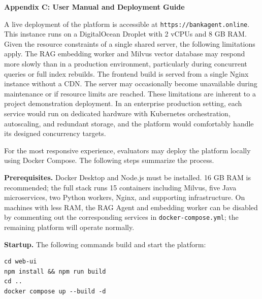 \newpage
{}
\begin{center}
{\fontsize{16}{19}\selectfont\textbf{Appendix C: User Manual and Deployment Guide}}
\end{center}

\vspace{3mm}


A live deployment of the platform is accessible at \texttt{https://bankagent.online}. This instance runs on a DigitalOcean Droplet with 2 vCPUs and 8 GB RAM. Given the resource constraints of a single shared server, the following limitations apply. The RAG embedding worker and Milvus vector database may respond more slowly than in a production environment, particularly during concurrent queries or full index rebuilds. The frontend build is served from a single Nginx instance without a CDN. The server may occasionally become unavailable during maintenance or if resource limits are reached. These limitations are inherent to a project demonstration deployment. In an enterprise production setting, each service would run on dedicated hardware with Kubernetes orchestration, autoscaling, and redundant storage, and the platform would comfortably handle its designed concurrency targets.


For the most responsive experience, evaluators may deploy the platform locally using Docker Compose. The following steps summarize the process.

\textbf{Prerequisites.} Docker Desktop and Node.js must be installed. 16 GB RAM is recommended; the full stack runs 15 containers including Milvus, five Java microservices, two Python workers, Nginx, and supporting infrastructure. On machines with less RAM, the RAG Agent and embedding worker can be disabled by commenting out the corresponding services in \texttt{docker-compose.yml}; the remaining platform will operate normally.

\textbf{Startup.} The following commands build and start the platform:

\begin{lstlisting}
cd web-ui
npm install && npm run build
cd ..
docker compose up --build -d
\end{lstlisting}

